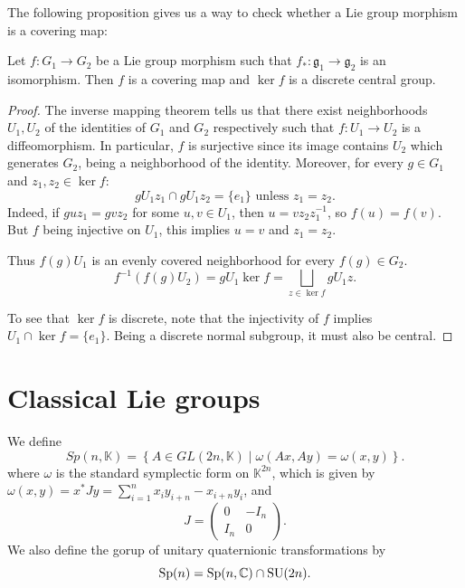 \documentclass{report}
\begin{document}
The following proposition gives us a way to check whether a Lie group morphism is a covering map:
\begin{proposition}\label{prop:covering_map_criterion}
    Let $f:G_1 \to G_2$ be a Lie group morphism such that $f_*: \mathfrak g_1 \to \mathfrak g_2$ is an isomorphism.
    Then $f$ is a covering map and $\ker f$ is a discrete central group.
\end{proposition}
\begin{proof}
    The inverse mapping theorem tells us that there exist neighborhoods $U_1, U_2$ of the identities of $G_1$ and $G_2$ respectively such that $f:U_1 \to U_2$ is a diffeomorphism.
    In particular, $f$ is surjective since its image contains $U_2$ which generates $G_2$, being a neighborhood of the identity.
    Moreover, for every $g \in G_1$ and $z_1, z_2 \in \ker f$:
    \[
        gU_1 z_1 \cap gU_1 z_2 = \{e_1\} \text{ unless } z_1 = z_2.
    \]
    Indeed, if $g u z_1 = g v z_2$ for some $u, v \in U_1$, then $u = v z_2 z_1^{-1}$, so $f(u) = f(v)$.
    But $f$ being injective on $U_1$, this implies $u = v$ and $z_1 = z_2$.

    Thus $f(g)U_1$ is an evenly covered neighborhood for every $f(g) \in G_2$.
    \[
    f^{-1}(f(g)U_2) = g U_1 \ker f = \bigsqcup_{z \in \ker f} g U_1 z.
    \]

    To see that $\ker f$ is discrete, note that the injectivity of $f$ implies $U_1 \cap \ker f = \{ e_1 \}$.
    Being a discrete normal subgroup, it must also be central.
\end{proof}

\section{Classical Lie groups}

\begin{definition}
    We define
    \[
    Sp(n, \mathbb K) = 
    \left\{
        A \in GL(2n, \mathbb K) \mid \omega(Ax, Ay) = \omega(x, y)
    \right\}.
    \]
    where $\omega$ is the standard symplectic form on $\mathbb K^{2n}$, which is given by
    $\omega(x, y) = x^* J y = \sum_{i=1}^n x_i y_{i+n} - x_{i+n}y_i$, 
    and 
    \[
    J = 
    \begin{pmatrix}
    0 & -I_n \\
    I_n & 0
    \end{pmatrix}.
    \]
    We also define the gorup of unitary quaternionic transformations by
    \[
    \operatorname{{\mathrm{Sp}}}(n) = \operatorname{{\mathrm{Sp}}}(n, \mathbb C) \cap \operatorname{{\mathrm{SU}}}(2n).
    \]
\end{definition}
\end{document}
